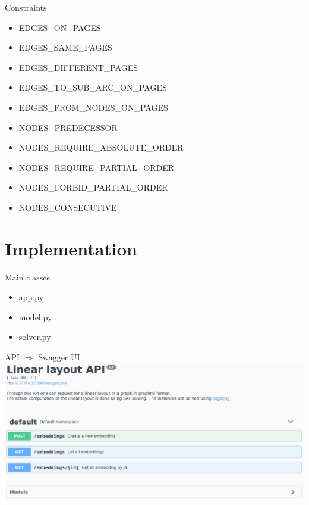 \documentclass[11pt]{beamer}
\begin{document}
    \begin{frame}{Constraints}
        \begin{itemize}
            \item EDGES\_ON\_PAGES
            \item EDGES\_SAME\_PAGES
            \item EDGES\_DIFFERENT\_PAGES
            \item \alert<2>{EDGES\_TO\_SUB\_ARC\_ON\_PAGES}
            \item EDGES\_FROM\_NODES\_ON\_PAGES
            \item \alert<2>{NODES\_PREDECESSOR}
            \item NODES\_REQUIRE\_ABSOLUTE\_ORDER
            \item NODES\_REQUIRE\_PARTIAL\_ORDER
            \item NODES\_FORBID\_PARTIAL\_ORDER
            \item NODES\_CONSECUTIVE
        \end{itemize}
    \end{frame}

    \section{Implementation}\label{sec:implementation}
    \begin{frame}{Main classes}
        \begin{itemize}
            \item app.py
            \item model.py
            \item solver.py
        \end{itemize}
    \end{frame}

    \begin{frame}{API $\Rightarrow$ Swagger UI}
        \includegraphics[width=\linewidth]{swagger-UI.png}
    \end{frame}
\end{document}
